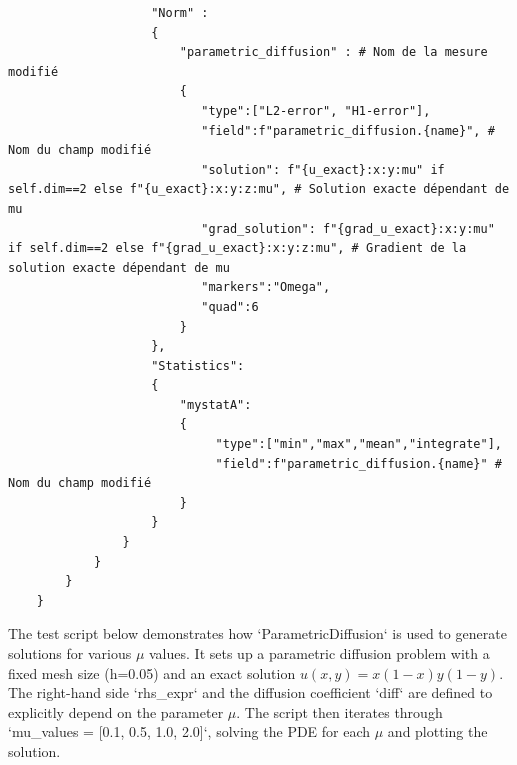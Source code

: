 \documentclass{article}
\begin{document}
\begin{verbatim}
                    "Norm" :
                    {
                        "parametric_diffusion" : # Nom de la mesure modifié
                        {
                           "type":["L2-error", "H1-error"],
                           "field":f"parametric_diffusion.{name}", # Nom du champ modifié
                           "solution": f"{u_exact}:x:y:mu" if self.dim==2 else f"{u_exact}:x:y:z:mu", # Solution exacte dépendant de mu
                           "grad_solution": f"{grad_u_exact}:x:y:mu" if self.dim==2 else f"{grad_u_exact}:x:y:z:mu", # Gradient de la solution exacte dépendant de mu
                           "markers":"Omega",
                           "quad":6
                        }
                    },
                    "Statistics":
                    {
                        "mystatA":
                        {
                             "type":["min","max","mean","integrate"],
                             "field":f"parametric_diffusion.{name}" # Nom du champ modifié
                        }
                    }
                }
            }
        }
    }
\end{verbatim}

The test script below demonstrates how `ParametricDiffusion` is used to generate solutions for various $\mu$ values. It sets up a parametric diffusion problem with a fixed mesh size (h=0.05) and an exact solution $u(x,y) = x(1-x)y(1-y)$. The right-hand side `rhs_expr` and the diffusion coefficient `diff` are defined to explicitly depend on the parameter $\mu$. The script then iterates through `mu_values = [0.1, 0.5, 1.0, 2.0]`, solving the PDE for each $\mu$ and plotting the solution.
\end{document}
